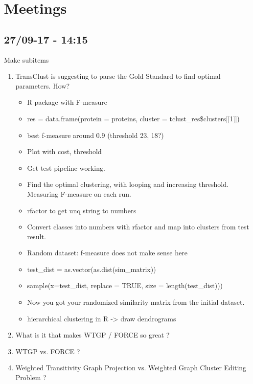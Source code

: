 \documentclass[a4paper,10pt]{article}
\begin{document}
\newpage
\section{Meetings}

\subsection{27/09-17 - 14:15}
Make subitems
\begin{enumerate}
	\item TransClust is suggesting to parse the Gold Standard to find optimal parameters. How?
	\begin{itemize}
		\item R package with F-measure
		\item res = data.frame(protein = proteins, cluster = tclust\_res\$clusters[[1]])
		\item best f-measure around 0.9 (threshold 23, 18?)
		\item Plot with cost, threshold
		\item Get test pipeline working.
		\item Find the optimal clustering, with looping and increasing threshold. Measuring F-measure on each run.
		\item rfactor to get unq string to numbers
		\item Convert classes into numbers with rfactor and map into clusters from test result.
		\item Random dataset: f-measure does not make sense here
		\item test\_dist = as.vector(as.dist(sim\_matrix))
		\item sample(x=test\_dist, replace = TRUE, size = length(test\_dist)))
		\item Now you got your randomized similarity matrix from the initial dataset.
		\item hierarchical clustering in R -> draw dendrograms
	\end{itemize}
	\item What is it that makes WTGP / FORCE so great ?
	\item WTGP vs. FORCE ?
	\item Weighted Transitivity Graph Projection vs. Weighted Graph Cluster Editing Problem ?
\end{enumerate}
\end{document}

